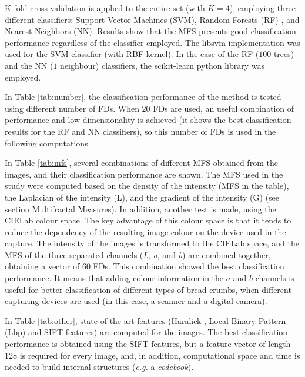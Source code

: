 \documentclass[twocolumn]{bmcart}%
\begin{document}
K-fold cross validation is applied to the entire set (with $K=4$), employing three different classifiers: Support Vector Machines (SVM), Random Forests (RF) \cite{Breiman2001}, and Nearest Neighbors (NN). Results show that the MFS presents good classification performance regardless of the classifier employed. The \textsf{libsvm} implementation \cite{Chang2011} was used for the SVM classifier (with RBF kernel). In the case of the RF ($100$ trees) and the NN ($1$ neighbour) classifiers, the \textsf{scikit-learn} python library was employed.

In Table \ref{tab:number}, the classification performance of the method is tested using different number of FDs. When $20$ FDs are used, an useful combination of performance and low-di\-men\-sio\-na\-li\-ty is achieved (it shows the best classification results for the RF and NN classifiers), so this number of FDs is used in the following computations. 

In Table \ref{tab:mfs}, several combinations of different MFS obtained from the images, and their classification performance are shown. The MFS used in the study were computed based on the density of the intensity (MFS in the table), the Laplacian of the intensity (L), and the gradient of the intensity (G) (see section Multifractal Measures). In addition, another test is made, using the CIELab \cite{Hunter58} colour space. The key advantage of this colour space is that it tends to reduce the dependency of the resulting image colour on the device used in the capture. The intensity of the images is transformed to the CIELab space, and the MFS of the three separated channels ({\em L}, {\em a}, and {\em b}) are combined together, obtaining a vector of $60$ FDs. This combination showed the best classification performance. It means that adding colour information in the $a$ and $b$ channels is useful for better classification of different types of bread crumbs, when different capturing devices are used (in this case, a scanner and a digital camera).

In Table \ref{tab:other}, state-of-the-art features (Haralick \cite{Haralick73}, Local Binary Pattern (Lbp) \cite{Ojala96} and SIFT \cite{Lowe2004} features) are computed for the images. The best classification performance is obtained using the SIFT features, but a feature vector of length 128 is required for every image, and, in addition, computational space and time is needed to build internal structures ({\em e.g.} a {\em codebook}). 
\end{document}
